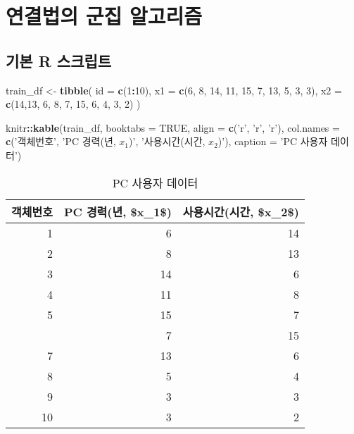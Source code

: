 \documentclass[]{book}
\newenvironment{Shaded}{\begin{snugshade}}{\end{snugshade}}
\newcommand{\DataTypeTok}[1]{\textcolor[rgb]{0.13,0.29,0.53}{#1}}
\newcommand{\DecValTok}[1]{\textcolor[rgb]{0.00,0.00,0.81}{#1}}
\newcommand{\KeywordTok}[1]{\textcolor[rgb]{0.13,0.29,0.53}{\textbf{#1}}}
\newcommand{\NormalTok}[1]{#1}
\newcommand{\OperatorTok}[1]{\textcolor[rgb]{0.81,0.36,0.00}{\textbf{#1}}}
\newcommand{\OtherTok}[1]{\textcolor[rgb]{0.56,0.35,0.01}{#1}}
\newcommand{\StringTok}[1]{\textcolor[rgb]{0.31,0.60,0.02}{#1}}
\begin{document}
\hypertarget{linkage-method}{%
\section{연결법의 군집 알고리즘}\label{linkage-method}}

\hypertarget{linkage-method-basic-script}{%
\subsection{기본 R 스크립트}\label{linkage-method-basic-script}}

\begin{Shaded}
\begin{Highlighting}[]
\NormalTok{train_df <-}\StringTok{ }\KeywordTok{tibble}\NormalTok{(}
  \DataTypeTok{id =} \KeywordTok{c}\NormalTok{(}\DecValTok{1}\OperatorTok{:}\DecValTok{10}\NormalTok{),}
  \DataTypeTok{x1 =} \KeywordTok{c}\NormalTok{(}\DecValTok{6}\NormalTok{, }\DecValTok{8}\NormalTok{, }\DecValTok{14}\NormalTok{, }\DecValTok{11}\NormalTok{, }\DecValTok{15}\NormalTok{, }\DecValTok{7}\NormalTok{, }\DecValTok{13}\NormalTok{, }\DecValTok{5}\NormalTok{, }\DecValTok{3}\NormalTok{, }\DecValTok{3}\NormalTok{),}
  \DataTypeTok{x2 =} \KeywordTok{c}\NormalTok{(}\DecValTok{14}\NormalTok{,}\DecValTok{13}\NormalTok{, }\DecValTok{6}\NormalTok{, }\DecValTok{8}\NormalTok{, }\DecValTok{7}\NormalTok{, }\DecValTok{15}\NormalTok{, }\DecValTok{6}\NormalTok{, }\DecValTok{4}\NormalTok{, }\DecValTok{3}\NormalTok{, }\DecValTok{2}\NormalTok{)}
\NormalTok{)}

\NormalTok{knitr}\OperatorTok{::}\KeywordTok{kable}\NormalTok{(train_df, }\DataTypeTok{booktabs =} \OtherTok{TRUE}\NormalTok{,}
             \DataTypeTok{align =} \KeywordTok{c}\NormalTok{(}\StringTok{'r'}\NormalTok{, }\StringTok{'r'}\NormalTok{, }\StringTok{'r'}\NormalTok{),}
             \DataTypeTok{col.names =} \KeywordTok{c}\NormalTok{(}\StringTok{'객체번호'}\NormalTok{, }\StringTok{'PC 경력(년, $x_1$)'}\NormalTok{, }\StringTok{'사용시간(시간, $x_2$)'}\NormalTok{),}
             \DataTypeTok{caption =} \StringTok{'PC 사용자 데이터'}\NormalTok{)}
\end{Highlighting}
\end{Shaded}

\begin{table}[t]

\caption{\label{tab:pc-user-data}PC 사용자 데이터}
\centering
\begin{tabular}{rrr}
\toprule
객체번호 & PC 경력(년, \$x\_1\$) & 사용시간(시간, \$x\_2\$)\\
\midrule
1 & 6 & 14\\
2 & 8 & 13\\
3 & 14 & 6\\
4 & 11 & 8\\
5 & 15 & 7\\
\addlinespace
6 & 7 & 15\\
7 & 13 & 6\\
8 & 5 & 4\\
9 & 3 & 3\\
10 & 3 & 2\\
\bottomrule
\end{tabular}
\end{table}
\end{document}
